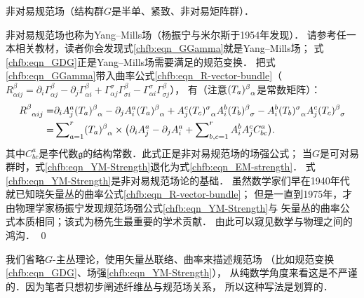 \begin{example}
	非对易规范场（结构群$G$是半单、紧致、非对易矩阵群）．
\end{example}
非对易规范场也称为Yang--Mills场（杨振宁与米尔斯于1954年发现）．
请参考任一本相关教材，读者你会发现式\eqref{chfb:eqn_GGamma}就是Yang--Mills场；
式\eqref{chfb:eqn_GDG}正是Yang--Mills场需要满足的规范变换．
把式\eqref{chfb:eqn_GGamma}带入曲率公式\eqref{chfb:eqn_R-vector-bundle}（$R_{\alpha i j}^\beta 
= {\partial_i} \Gamma_{\alpha j}^{\beta} -\partial_j \Gamma_{\alpha i}^{\beta}
+\Gamma_{\alpha j}^{\sigma} \Gamma_{\sigma i}^{\beta} -  \Gamma_{\alpha i}^{\sigma}\Gamma_{\sigma j}^{\beta}$），
有（注意$(T_a)_{\hphantom{\alpha}\alpha}^\beta $是常数矩阵）：
\begin{align}
	R_{\hphantom{\alpha}\alpha i j}^\beta 
	=&{\partial_i} A^a_j (T_a)_{\hphantom{\alpha}\alpha}^\beta 
	-\partial_j A^a_i (T_a)_{\hphantom{\alpha}\alpha}^\beta 
	+A^c_j (T_c)_{\hphantom{\alpha}\alpha}^\sigma  A^b_i (T_b)_{\hphantom{\alpha}\sigma}^\beta
	-A^b_i (T_b)_{\hphantom{\alpha}\alpha}^\sigma  A^c_j (T_c)_{\hphantom{\alpha}\sigma}^\beta \notag\\
	=& \sum\nolimits_{a=1}^{r}(T_a)_{\hphantom{\alpha}\alpha}^\beta  \times \bigl(
	{\partial_i} A^a_j  -\partial_j A^a_i  + \sum\nolimits_{b,c=1}^{r} A^b_i A^c_j C_{bc}^a    \bigr) .
	\label{chfb:eqn_YM-Strength}
\end{align}
其中$C_{bc}^a$是李代数$\mathfrak{g}$的结构常数．此式正是非对易规范场的场强公式；
当$G$是可对易群时，式\eqref{chfb:eqn_YM-Strength}退化为式\eqref{chfb:eqn_EM-strength}．
式\eqref{chfb:eqn_YM-Strength}是非对易规范场论的基础．
虽然数学家们早在1940年代就已知晓矢量丛的曲率公式\eqref{chfb:eqn_R-vector-bundle}；
但是一直到1975年，才由物理学家杨振宁发现规范场强公式\eqref{chfb:eqn_YM-Strength}与
矢量丛的曲率公式本质相同；该式为杨先生最重要的学术贡献．
由此可以窥见数学与物理之间的鸿沟．
\qed


\begin{remark}
	我们{\kaishu 省略$G$-主丛理论}，使用矢量丛联络、曲率来描述规范场
	（比如规范变换\eqref{chfb:eqn_GDG}、场强\eqref{chfb:eqn_YM-Strength}），
	从纯数学角度来看这是不严谨的．因为笔者只想初步阐述纤维丛与规范场关系，
	所以这种写法是划算的．
\end{remark}




